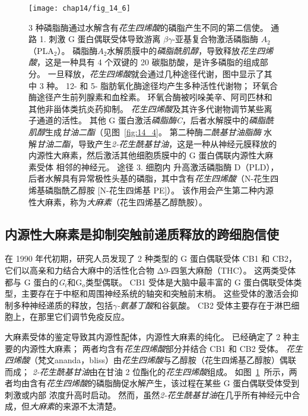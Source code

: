 \begin{figure}[htbp]
	\centering
	\texttt{[image: chap14/fig\_14\_6]}
	\caption{3 种磷脂酶通过水解含有\textit{花生四烯酸}的磷脂产生不同的第二信使。
		通路 1. 刺激 G 蛋白偶联受体导致游离 $\beta \gamma$-亚基复合物激活磷脂酶 $A_2$（PLA$_2$）。
		磷脂酶$A_2$水解质膜中的\textit{磷脂酰肌醇}，导致释放\textit{花生四烯酸}，这是一种具有 4 个双键的 20 碳脂肪酸，是许多磷脂的组成部分。
		一旦释放，\textit{花生四烯酸}就会通过几种途径代谢，图中显示了其中 3 种。
		12- 和 5- 脂肪氧化酶途径均产生多种活性代谢物；
		环氧合酶途径产生前列腺素和血栓素。
		环氧合酶被吲哚美辛、阿司匹林和其他非甾体类抗炎药抑制。
		\textit{花生四烯酸}及其许多代谢物调节某些离子通道的活性。
		其他 G 蛋白激活\textit{磷脂酶C}，后者水解膜中的\textit{磷脂酰肌醇}生成\textit{甘油二酯}（见图~\ref{fig:14_4}。
		第二种酶\textit{二酰基甘油脂酶} 水解\textit{甘油二酯}，导致产生\textit{2-花生酰基甘油}，这是一种从神经元膜释放的内源性大麻素，然后激活其他细胞质膜中的 G 蛋白偶联内源性大麻素受体 相邻的神经元。
		途径 3. 细胞内  升高激活磷脂酶 D（PLD），后者水解具有异常极性头基的磷脂，其中含有\textit{花生四烯酸}（N-花生四烯基磷脂酰乙醇胺 [N-花生四烯基 PE]）。
		该作用会产生第二种内源性大麻素，称为\textit{大麻素}（花生四烯基乙醇酰胺）。}
	\label{fig:14_6}
\end{figure}



\subsection{内源性大麻素是抑制突触前递质释放的跨细胞信使}

在 1990 年代初期，研究人员发现了 2 种类型的 G 蛋白偶联受体 CB1 和 CB2，它们以高亲和力结合大麻中的活性化合物 Δ9-四氢大麻酚（THC）。
这两类受体都与 G 蛋白的\textit{G$_i $}和G$_o$类型偶联。
CB1 受体是大脑中最丰富的 G 蛋白偶联受体类型，主要存在于中枢和周围神经系统的轴突和突触前末梢。
这些受体的激活会抑制多种神经递质的释放，包括\textit{$\gamma$-氨基丁酸}和谷氨酸。
CB2 受体主要存在于淋巴细胞上，在那里它们调节免疫反应。


大麻素受体的鉴定导致其内源性配体，内源性大麻素的纯化。
已经确定了 2 种主要的内源性大麻素；
两者均含有\textit{花生四烯酸}部分并结合 CB1 和 CB2 受体。 
\textit{花生四烯酸}（梵文ananda，bliss）由\textit{花生四烯酸}与乙醇胺（花生四烯基乙醇胺）偶联而成；
\textit{2-花生酰基甘油}由在甘油 2 位酯化的\textit{花生四烯酸}组成。
如图~\ref{fig:14_6}~所示，两者均由含有\textit{花生四烯酸}的磷脂酶促水解产生，该过程在某些 G 蛋白偶联受体受到刺激或内部  浓度升高时启动。
然而，虽然\textit{2-花生酰基甘油}在几乎所有神经元中合成，但\textit{大麻素}的来源不太清楚。


